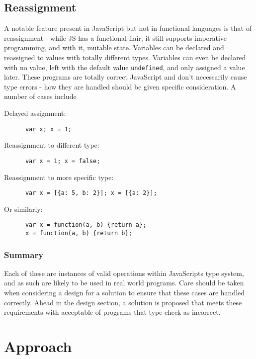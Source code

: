 \documentclass[british, twoside]{bhamthesis}
\theoremstyle{definition}
\begin{document}
  \subsection{Reassignment}

    A notable feature present in JavaScript but not in functional languages is that of reassignment - while JS has a functional flair, it still supports imperative programming, and with it, mutable state. Variables can be declared and reassigned to values with totally different types. Variables can even be declared with no value, left with the default value \texttt{undefined}, and only assigned a value later. These programs are totally correct JavaScript and don't necessarily cause type errors - how they are handled should be given specific consideration. A number of cases include

    Delayed assignment:
    \begin{lstlisting}
      var x; x = 1;
    \end{lstlisting}

    Reassignment to different type:
    \begin{lstlisting}
      var x = 1; x = false;
    \end{lstlisting}

    Reassignment to more specific type:
    \begin{lstlisting}
      var x = [{a: 5, b: 2}]; x = [{a: 2}];
    \end{lstlisting}

    Or similarly:
    \begin{lstlisting}
      var x = function(a, b) {return a};
      x = function(a, b) {return b};
    \end{lstlisting}

  \subsubsection{Summary}

    Each of these are instances of valid operations within JavaScripts type system, and as such are likely to be used in real world programs. Care should be taken when considering a design for a solution to ensure that these cases are handled correctly. Ahead in the design section, a solution is proposed that meets these requirements with acceptable of programs that type check as incorrect.

  \section{Approach}
\end{document}
